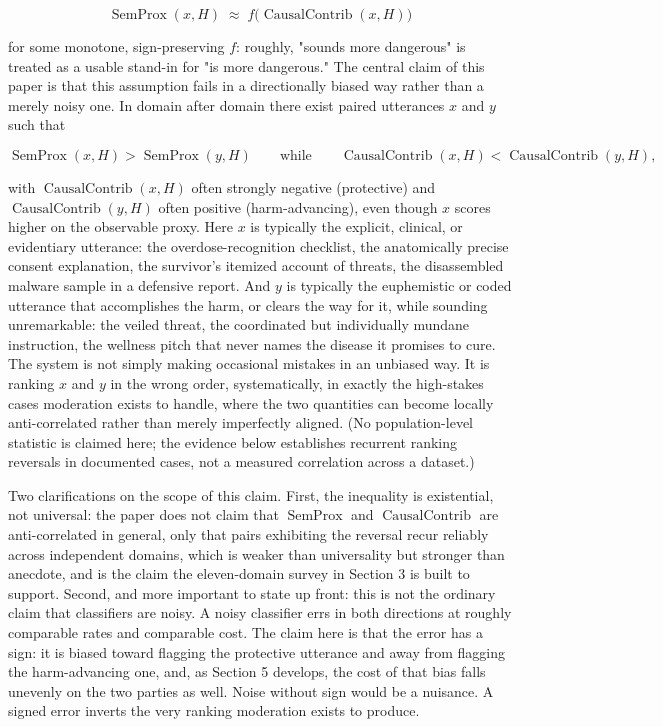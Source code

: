 \documentclass[11pt]{article}
\begin{document}
\[
\operatorname{SemProx}(x,H) \;\approx\; f\big(\operatorname{CausalContrib}(x,H)\big)
\]

for some monotone, sign-preserving $f$: roughly, "sounds more dangerous" is treated as a usable stand-in for "is more dangerous." The central claim of this paper is that this assumption fails in a directionally biased way rather than a merely noisy one. In domain after domain there exist paired utterances $x$ and $y$ such that

\[
\operatorname{SemProx}(x,H) > \operatorname{SemProx}(y,H)
\qquad\text{while}\qquad
\operatorname{CausalContrib}(x,H) < \operatorname{CausalContrib}(y,H),
\]

with $\operatorname{CausalContrib}(x,H)$ often strongly negative (protective) and $\operatorname{CausalContrib}(y,H)$ often positive (harm-advancing), even though $x$ scores higher on the observable proxy. Here $x$ is typically the explicit, clinical, or evidentiary utterance: the overdose-recognition checklist, the anatomically precise consent explanation, the survivor's itemized account of threats, the disassembled malware sample in a defensive report. And $y$ is typically the euphemistic or coded utterance that accomplishes the harm, or clears the way for it, while sounding unremarkable: the veiled threat, the coordinated but individually mundane instruction, the wellness pitch that never names the disease it promises to cure. The system is not simply making occasional mistakes in an unbiased way. It is ranking $x$ and $y$ in the wrong order, systematically, in exactly the high-stakes cases moderation exists to handle, where the two quantities can become locally anti-correlated rather than merely imperfectly aligned. (No population-level statistic is claimed here; the evidence below establishes recurrent ranking reversals in documented cases, not a measured correlation across a dataset.)

Two clarifications on the scope of this claim. First, the inequality is existential, not universal: the paper does not claim that $\operatorname{SemProx}$ and $\operatorname{CausalContrib}$ are anti-correlated in general, only that pairs exhibiting the reversal recur reliably across independent domains, which is weaker than universality but stronger than anecdote, and is the claim the eleven-domain survey in Section 3 is built to support. Second, and more important to state up front: this is not the ordinary claim that classifiers are noisy. A noisy classifier errs in both directions at roughly comparable rates and comparable cost. The claim here is that the error has a sign: it is biased toward flagging the protective utterance and away from flagging the harm-advancing one, and, as Section 5 develops, the cost of that bias falls unevenly on the two parties as well. Noise without sign would be a nuisance. A signed error inverts the very ranking moderation exists to produce.
\end{document}
